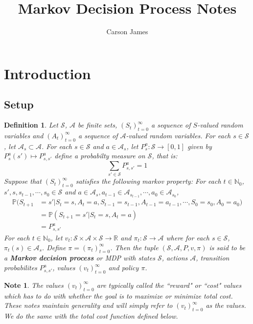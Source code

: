 \documentclass[12pt]{amsart}
\newtheorem{defn}[thm]{Definition}
\newtheorem{note}[thm]{Note}
\newcommand{\N}{\mathbb{N}}
\newcommand{\R}{\mathbb{R}}
\renewcommand{\P}{\mathbb{P}}
\newcommand{\MA}{\mathcal{A}}
\newcommand{\MS}{\mathcal{S}}
\begin{document}
\title{Markov Decision Process Notes}
\author[James]{Carson James}
\maketitle


\tableofcontents

\section{Introduction}

\subsection{Setup}
\begin{defn}
Let $\MS$, $\MA$ be finite sets, $(S_t)_{t=0}^{\infty}$ a sequence of $S$-valued random variables and $(A_t)_{t=0}^{\infty}$ a sequence of $\MA$-valued random variables. For each $s \in \MS$, let $\MA_s \subset \MA$. For each $s \in \MS$ and $a \in \MA_s$, let $P^a_s: \MS \rightarrow [0,1]$ given by $P^a_s(s') \mapsto P^{a}_{s,s'}$ define a probabilty measure on $\MS$, that is: $$\sum_{s' \in \MS} P^{a}_{s,s'} = 1$$ Suppose that $(S_t)_{t=0}^{\infty}$ satisfies the following markov property: For each $t \in \N_0$, $s', s, s_{t-1}, \cdots, s_0 \in \MS$ and $a \in \MA_{s}, a_{t-1} \in \MA_{s_{t-1}}, \cdots, a_0 \in \MA_{s_0}$,
\begin{align*}
\P(S_{t+1} 
&= s'| S_t =s, A_t = a, S_{t-1} = s_{t-1}, A_{t-1}=a_{t-1}, \cdots, S_0=s_0, A_0 = a_0) \\
&= \P(S_{t+1} = s'| S_t =s, A_t = a) \\
&= P^a_{s, s'}
\end{align*}
For each $t \in \N_0$, let $v_t: \MS \times \MA \times \MS  \rightarrow \R$ and $\pi_t:\MS \rightarrow \MA$ where for each $s \in \MS$, $\pi_t(s) \in \MA_s$. Define $\pi = (\pi_t)_{t=0}^{\infty}$. Then the tuple $(\MS, \MA, P, v, \pi)$ is said to be a \textbf{Markov decision process} or MDP with states $\MS$, actions $\MA$, transition probabilites $P^a_{s,s'}$, values $(v_t)_{t=0}^{\infty}$ and policy $\pi$.
\end{defn}

\begin{note}
The values $(v_t)_{t=0}^{\infty}$ are typically called the ``reward" or ``cost" values which has to do with whether the goal is to maximize or minimize total cost. These notes maintain generality and will simply refer to $(v_t)_{t=0}^{\infty}$ as the values. We do the same with the total cost function defined below.
\end{note}
\newpage
\end{document}
